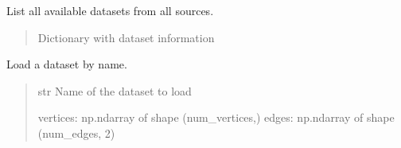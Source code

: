 \documentclass[letterpaper,10pt,english]{sphinxmanual}
\begin{document}

\begin{fulllineitems}
\label{\detokenize{graphem:graphem.datasets.list_available_datasets}}
\pysigstartsignatures
{}
\pysigstopsignatures
\sphinxAtStartPar
List all available datasets from all sources.
\begin{quote}\begin{description}
\sphinxAtStartPar
Dictionary with dataset information

\sphinxAtStartPar
{}

\end{description}\end{quote}

\end{fulllineitems}


\begin{fulllineitems}
\label{\detokenize{graphem:graphem.datasets.load_dataset}}
\pysigstartsignatures
{}
\pysigstopsignatures
\sphinxAtStartPar
Load a dataset by name.
\begin{quote}\begin{description}
\sphinxAtStartPar
{} \textendash{} str
Name of the dataset to load

\sphinxAtStartPar
\begin{description}
\sphinxAtStartPar
vertices: np.ndarray of shape (num\_vertices,)
edges: np.ndarray of shape (num\_edges, 2)

\end{description}


\sphinxAtStartPar
{}

\end{description}\end{quote}

\end{fulllineitems}
\end{document}
